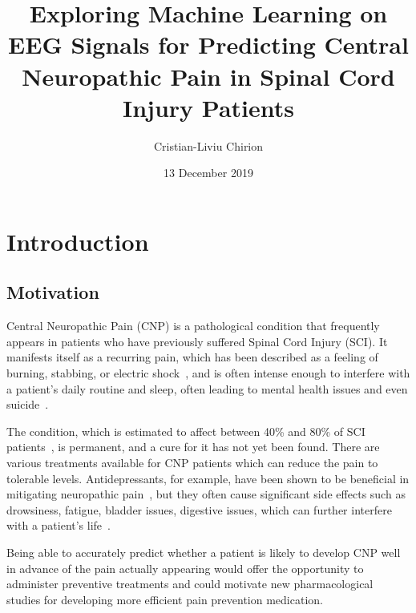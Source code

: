 \documentclass{mprop}
\begin{document}
\title{Exploring Machine Learning on EEG Signals for Predicting Central Neuropathic Pain in Spinal Cord Injury Patients}
\author{Cristian-Liviu Chirion}
\date{13 December 2019}
\maketitle

\educationalconsent
\newpage

\tableofcontents
\newpage

\section{Introduction}\label{intro}

\subsection{Motivation}

Central Neuropathic Pain (CNP) is a pathological condition that frequently appears in patients who have previously suffered Spinal Cord Injury (SCI). It manifests itself as a recurring pain, which has been described as a feeling of burning, stabbing, or electric shock~\cite{hulsebosch_mechanisms_2009}, and is often intense enough to interfere with a patient's daily routine and sleep, often leading to mental health issues and even suicide~\cite{hulsebosch_mechanisms_2009,vuckovic_prediction_2018}.

The condition, which is estimated to affect between 40\% and 80\% of SCI patients~\cite{hulsebosch_mechanisms_2009,vuckovic_prediction_2018}, is permanent, and a cure for it has not yet been found. There are various treatments available for CNP patients which can reduce the pain to tolerable levels. Antidepressants, for example, have been shown to be beneficial in mitigating neuropathic pain~\cite{finnerup_review_2008}, but they often cause significant side effects such as drowsiness, fatigue, bladder issues, digestive issues, which can further interfere with a patient's life~\cite{finnerup_review_2008,khawam_side_2006}.

Being able to accurately predict whether a patient is likely to develop CNP well in advance of the pain actually appearing would offer the opportunity to administer preventive treatments and could motivate new pharmacological studies for developing more efficient pain prevention medication.
\end{document}

